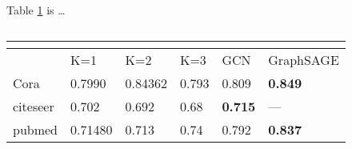 Table \ref{table:2} is \dots
\begin{table}[h!]
\centering
\caption{}
\begin{tabular}{ |p{2cm}||p{2cm}|p{2cm}|p{2cm}|p{2cm}|p{2cm}|}
 \hline 
 \multicolumn{6}{|c|}{\textbf{}} \\
 \hline
 &K=1& K=2 &K=3 &GCN & GraphSAGE\\
 \hline\hline
 Cora   & 0.7990    &0.84362 &0.793 &0.809 &\textbf{0.849}\\
 citeseer &   0.702  & 0.692 &0.68 &\textbf{0.715}& --- \\
 pubmed &0.71480 & 0.713 &0.74 &0.792 &\textbf{0.837}\\
 \hline
\end{tabular}\\
\label{table:2}
\end{table}
